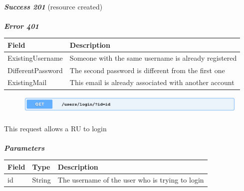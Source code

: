 					\paragraph{}
						\textcolor{myGreen}{\textit{\textbf{Success 201}}} (resource created)
					\paragraph{}
						\textcolor{myRed}{\textit{\textbf{Error 401}}}
						\vspace{-2mm}
						\begin{table}[!h]
							\begin{tabular}{L{0.3\textwidth}L{0.62\textwidth}}
								\toprule
								\textbf{Field} & \textbf{Description} \\
								\midrule
								 ExistingUsername & Someone with the same username is already registered \\
								 DifferentPassword & The second password is different from the first one \\
								 ExistingMail & This email is already associated with another account \\
								 \bottomrule
							\end{tabular}
						\end{table}
						\clearpage
						\begin{figure}[!h]
							\includegraphics[width=\textwidth]{images/Restful/RULogin}
						\end{figure}
						\paragraph{}
						\vspace{-7.5mm}
						This request allows a RU to login
						\paragraph{}
							\textcolor{myBlue}{\textit{\textbf{Parameters}}}
							\vspace{-2mm}
							\begin{table}[!h]
								\begin{tabular}{L{0.15\textwidth}L{0.15\textwidth}L{0.58\textwidth}}
									\toprule
									\textbf{Field} & \textbf{Type} & \textbf{Description} \\
									\midrule
								 	id & String & The username of the user who is trying to login \\
								 	\bottomrule
								\end{tabular}
							\end{table}
